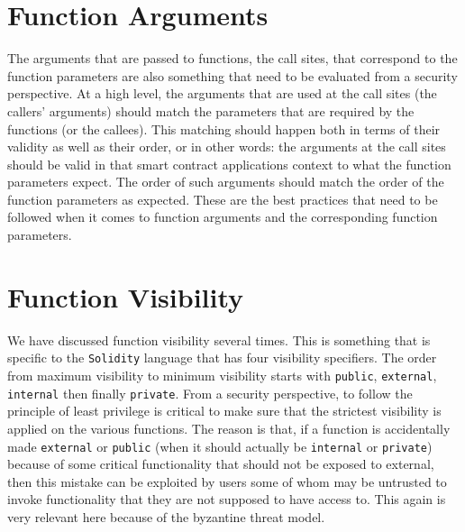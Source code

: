 \section{Function Arguments}
The arguments that are passed to functions, the call sites, that correspond to the function parameters are also something that need to be evaluated from a security perspective. At a high level, the arguments that are used at the call sites (the callers' arguments) should match the parameters that are required by the functions (or the callees). This matching should happen both in terms of their validity as well as their order, or in other words: the arguments at the call sites should be valid in that smart contract applications context to what the function parameters expect. The order of such arguments should match the order of the function parameters as expected. These are the best practices that need to be followed when it comes to function arguments and the corresponding function parameters.

\section{Function Visibility}
We have discussed function visibility several times. This is something that is specific to the \verb|Solidity| language that has four visibility specifiers. The order from maximum visibility to minimum visibility starts with \verb|public|, \verb|external|, \verb|internal| then finally \verb|private|. From a security perspective, to follow the principle of least privilege is critical to make sure that the strictest visibility is applied on the various functions. The reason is that, if a function is accidentally made \verb|external| or \verb|public| (when it should actually be \verb|internal| or \verb|private|) because of some critical functionality that should not be exposed to external, then this mistake can be exploited by users some of whom may be untrusted to invoke functionality that they are not supposed to have access to. This again is very relevant here because of the byzantine threat model.

